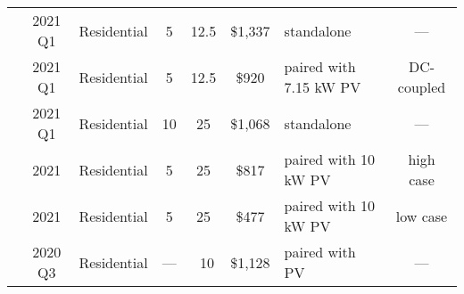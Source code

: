 \begin{tabular}{rccccclc}
\citet{ramasamy2021}   & 2021 Q1                                                                         & Residential                                                                & 5                        & 12.5                     & \$1,337                 & standalone                                                                                          &         ---               \\
\citet{ramasamy2021}   & 2021 Q1                                                                         & Residential                                                                & 5                        & 12.5                     & \$920                   & paired with 7.15 kW PV                                                                              &   DC-coupled                    \\
\citet{ramasamy2021}   & 2021 Q1                                                                         & Residential                                                                & 10                       & 25                       & \$1,068                 & standalone                                                                                          &          ---             \\
\citet{LazardLCOSv7}            & 2021                                                                            & Residential                                                                & 5                        & 25                       & \$817                   & paired with 10 kW PV                                                                                & high case              \\
\citet{LazardLCOSv7}                & 2021                                                                            & Residential                                                                & 5                        & 25                       & \$477                   & paired with 10 kW PV                                                                                & low case               \\ 
\citet{EnergySage2021}                & 2020 Q3                                                                            & Residential                                                                & ---           & ~10                       & \$1,128                   & paired with PV                                                                                &        ---        \\

\end{tabular}
